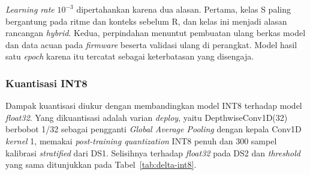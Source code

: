 \textit{Learning rate} $10^{-3}$ dipertahankan karena dua alasan. Pertama, kelas S paling bergantung pada ritme dan konteks sebelum R, dan kelas ini menjadi alasan rancangan \textit{hybrid}. Kedua, perpindahan menuntut pembuatan ulang berkas model dan data acuan pada \textit{firmware} beserta validasi ulang di perangkat. Model hasil satu \textit{epoch} karena itu tercatat sebagai keterbatasan yang disengaja.

\subsubsection{Kuantisasi INT8}

Dampak kuantisasi diukur dengan membandingkan model INT8 terhadap model \textit{float32}. Yang dikuantisasi adalah varian \textit{deploy}, yaitu DepthwiseConv1D(32) berbobot 1/32 sebagai pengganti \textit{Global Average Pooling} dengan kepala Conv1D \textit{kernel} 1, memakai \textit{post-training quantization} INT8 penuh dan 300 sampel kalibrasi \textit{stratified} dari DS1. Selisihnya terhadap \textit{float32} pada DS2 dan \textit{threshold} yang sama ditunjukkan pada Tabel~\ref{tab:delta-int8}.

